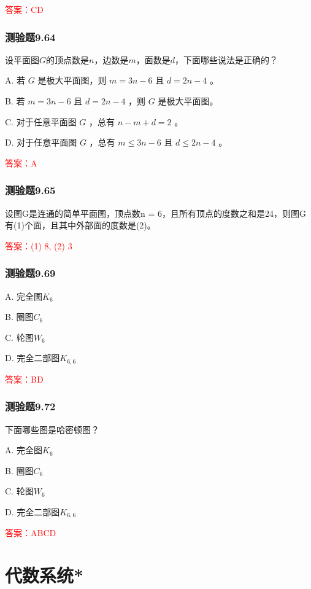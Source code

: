 \documentclass[UTF8, heading=true]{ctexart}
\begin{document}
\textcolor{red}{答案：CD}

\subsubsection{测验题9.64}

设平面图$G$的顶点数是$n$，边数是$m$，面数是$d$，下面哪些说法是正确的？

A. 若 $G$ 是极大平面图，则 $m=3 n-6$ 且 $d=2 n-4$ 。

B. 若 $m=3 n-6$ 且 $d=2 n-4$ ，则 $G$ 是极大平面图。

C. 对于任意平面图 $G$ ，总有 $n-m+d=2$ 。

D. 对于任意平面图 $G$ ，总有 $m \leq 3 n-6$ 且 $d \leq 2 n-4$ 。

\textcolor{red}{答案：A}

\subsubsection{测验题9.65}

设图G是连通的简单平面图，顶点数n = 6，且所有顶点的度数之和是24，则图G有(1)个面，且其中外部面的度数是(2)。

\textcolor{red}{答案：(1) 8, (2) 3}

\subsubsection{测验题9.69}

A. 完全图$K_6$

B. 圈图$C_6$

C. 轮图$W_6$

D. 完全二部图$K_{6,6}$

\textcolor{red}{答案：BD}

\subsubsection{测验题9.72}

下面哪些图是哈密顿图？

A. 完全图$K_6$

B. 圈图$C_6$

C. 轮图$W_6$

D. 完全二部图$K_{6,6}$

\textcolor{red}{答案：ABCD}

\clearpage

\section{代数系统*}
\end{document}
